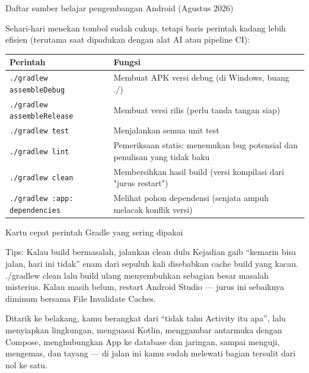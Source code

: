 \begin{center}\small\color{gray}Daftar sumber belajar pengembangan Android (Agustus 2026)\end{center}


Sehari-hari menekan tombol sudah cukup, tetapi baris perintah kadang lebih efisien (terutama saat dipadukan dengan alat AI atau pipeline CI):

\begin{center}
\begin{tabularx}{\linewidth}{|X|X|}
\hline
\textbf{Perintah} & \textbf{Fungsi} \tabularnewline
\hline
\texttt{.\allowbreak /\allowbreak gradlew assembleDebug} & Membuat APK versi debug (di Windows, buang ./) \tabularnewline
\texttt{.\allowbreak /\allowbreak gradlew assembleRelease} & Membuat versi rilis (perlu tanda tangan siap) \tabularnewline
\texttt{.\allowbreak /\allowbreak gradlew test} & Menjalankan semua unit test \tabularnewline
\texttt{.\allowbreak /\allowbreak gradlew lint} & Pemeriksaan statis: menemukan bug potensial dan penulisan yang tidak baku \tabularnewline
\texttt{.\allowbreak /\allowbreak gradlew clean} & Membersihkan hasil build (versi kompilasi dari "jurus restart") \tabularnewline
\texttt{.\allowbreak /\allowbreak gradlew :app: dependencies} & Melihat pohon dependensi (senjata ampuh melacak konflik versi) \tabularnewline
\hline
\end{tabularx}
\end{center}

\begin{center}\small\color{gray}Kartu cepat perintah Gradle yang sering dipakai\end{center}

\begin{tcbinfo}{Tips: Kalau build bermasalah, jalankan clean dulu}
Kejadian gaib “kemarin bisa jalan, hari ini tidak” enam dari sepuluh kali disebabkan cache build yang kacau. ./gradlew clean lalu build ulang menyembuhkan sebagian besar masalah misterius. Kalau masih belum, restart Android Studio — jurus ini sebaiknya diminum bersama File Invalidate Caches.

\end{tcbinfo}



Ditarik ke belakang, kamu berangkat dari “tidak tahu Activity itu apa”, lalu menyiapkan lingkungan, menguasai Kotlin, menggambar antarmuka dengan Compose, menghubungkan App ke database dan jaringan, sampai menguji, mengemas, dan tayang — di jalan ini kamu sudah melewati bagian tersulit dari nol ke satu.

